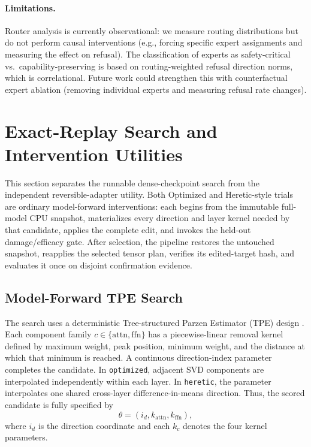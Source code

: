 \documentclass[11pt]{article}
\begin{document}
\paragraph{Limitations.}
Router analysis is currently observational: we measure routing distributions but do not perform causal interventions (e.g., forcing specific expert assignments and measuring the effect on refusal). The classification of experts as safety-critical vs.\ capability-preserving is based on routing-weighted refusal direction norms, which is correlational. Future work could strengthen this with counterfactual expert ablation (removing individual experts and measuring refusal rate changes).

\section{Exact-Replay Search and Intervention Utilities}
\label{sec:frontier}

This section separates the runnable dense-checkpoint search from the independent reversible-adapter utility. Both Optimized and Heretic-style trials are ordinary model-forward interventions: each begins from the immutable full-model CPU snapshot, materializes every direction and layer kernel needed by that candidate, applies the complete edit, and invokes the held-out damage/efficacy gate. After selection, the pipeline restores the untouched snapshot, reapplies the selected tensor plan, verifies its edited-target hash, and evaluates it once on disjoint confirmation evidence.

\subsection{Model-Forward TPE Search}
\label{sec:bayesian}

The search uses a deterministic Tree-structured Parzen Estimator (TPE) design \citep{akiba2019optuna}. Each component family $c\in\{\mathrm{attn},\mathrm{ffn}\}$ has a piecewise-linear removal kernel defined by maximum weight, peak position, minimum weight, and the distance at which that minimum is reached. A continuous direction-index parameter completes the candidate. In \texttt{optimized}, adjacent SVD components are interpolated independently within each layer. In \texttt{heretic}, the parameter interpolates one shared cross-layer difference-in-means direction. Thus, the scored candidate is fully specified by
\begin{equation}
    \theta = \left(i_d, k_{\mathrm{attn}}, k_{\mathrm{ffn}}\right),
\end{equation}
where $i_d$ is the direction coordinate and each $k_c$ denotes the four kernel parameters.
\end{document}
